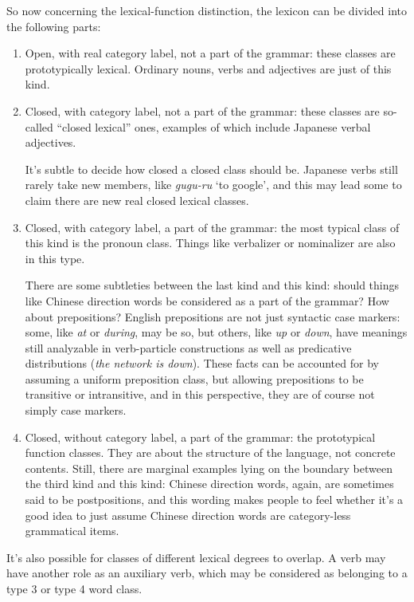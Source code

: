 \documentclass[UTF8, a4paper, oneside, scheme=plain]{ctexart}
\newcommand*{\corpus}[1]{\emph{#1}}
\newcommand*{\translate}[1]{`#1'}
\begin{document}
So now concerning the lexical-function distinction,
the lexicon can be divided into the following parts:
\begin{enumerate}
    \item Open, with real category label, not a part of the grammar: 
    these classes are prototypically lexical.
    Ordinary nouns, verbs and adjectives 
    are just of this kind.

    \item Closed, with category label, not a part of the grammar:
    these classes are so-called ``closed lexical'' ones,
    examples of which include Japanese verbal adjectives.

    It's subtle to decide how closed a closed class should be.
    Japanese verbs still rarely take new members, 
    like \corpus{gugu-ru} \translate{to google},
    and this may lead some to claim there are new real closed lexical classes.

    \item Closed, with category label, a part of the grammar:
    the most typical class of this kind is the pronoun class.
    Things like verbalizer or nominalizer are also in this type.

    There are some subtleties between the last kind and this kind:
    should things like Chinese direction words be considered as a part of the grammar?
    How about prepositions?
    English prepositions are not just syntactic case markers:
    some, like \corpus{at} or \corpus{during}, may be so,
    but others, like \corpus{up} or \corpus{down}, 
    have meanings still analyzable in verb-particle constructions 
    as well as predicative distributions (\corpus{the network is down}).
    These facts can be accounted for by assuming a uniform preposition class,
    but allowing prepositions to be transitive or intransitive,
    and in this perspective, they are of course not simply case markers.

    \item Closed, without category label, a part of the grammar:
    the prototypical function classes.
    They are about the structure of the language,
    not concrete contents.
    Still, there are marginal examples lying on the boundary between the third kind and this kind:
    Chinese direction words, again,
    are sometimes said to be postpositions,
    and this wording makes people to feel 
    whether it's a good idea to just assume 
    Chinese direction words are category-less grammatical items.
\end{enumerate}
It's also possible for classes of different lexical degrees to overlap.
A verb may have another role as an auxiliary verb,
which may be considered as belonging to a type 3 or type 4 word class.
\end{document}
